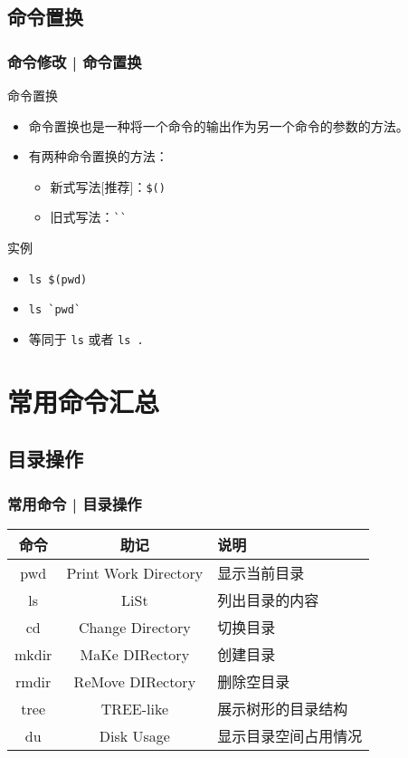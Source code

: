 \subsection{命令置换}
\begin{frame}[fragile]
  \frametitle{命令修改 | \alert{命令置换}}
  \begin{block}{命令置换}
    \begin{itemize}
      \item 命令置换也是一种将一个命令的输出作为另一个命令的参数的方法。
      \item 有两种命令置换的方法：
	\begin{itemize}
	  \item 新式写法[推荐]：\verb|$()|
	  \item 旧式写法：\verb|``|
	\end{itemize}
    \end{itemize}
  \end{block}
  \pause
  \begin{block}{实例}
    \begin{itemize}[<+->]
      \item \verb|ls $(pwd)|
      \item \verb|ls `pwd`|
      \item 等同于 \verb|ls| 或者 \verb|ls .|
    \end{itemize}
  \end{block}
\end{frame}

\section{常用命令汇总}
\subsection{目录操作}
\begin{frame}
  \frametitle{常用命令 | \alert{目录操作}}
  \begin{table}
    \centering
    \begin{tabular}{ccl}
      \hline
      \rowcolor{blue!50}命令 & 助记 & 说明\\
      \hline
      pwd & Print Work Directory & 显示当前目录\\
      ls & LiSt & 列出目录的内容\\
      cd & Change Directory & 切换目录\\
      mkdir & MaKe DIRectory & 创建目录\\
      rmdir & ReMove DIRectory & 删除空目录\\
      tree & TREE-like & 展示树形的目录结构\\
      du & Disk Usage & 显示目录空间占用情况\\
      \hline
    \end{tabular}
  \end{table}
\end{frame}

